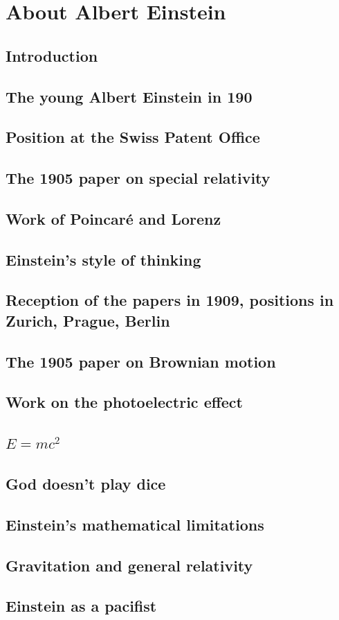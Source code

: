 \documentclass{article}
\begin{document}
\section{About Albert Einstein}
\subsection{Introduction}
\subsection{The young Albert Einstein in 190}
\subsection{Position at the Swiss Patent Office}
\subsection{The 1905 paper on special relativity}
\subsection{Work of Poincaré and Lorenz}
\subsection{Einstein's style of thinking}
\subsection{Reception of the papers in 1909, positions in Zurich, Prague, Berlin}
\subsection{The 1905 paper on Brownian motion}
\subsection{Work on the photoelectric effect}
\subsection{$E=mc^2$}
\subsection{God doesn't play dice}
\subsection{Einstein's mathematical limitations}
\subsection{Gravitation and general relativity}
\subsection{Einstein as a pacifist}
\end{document}

